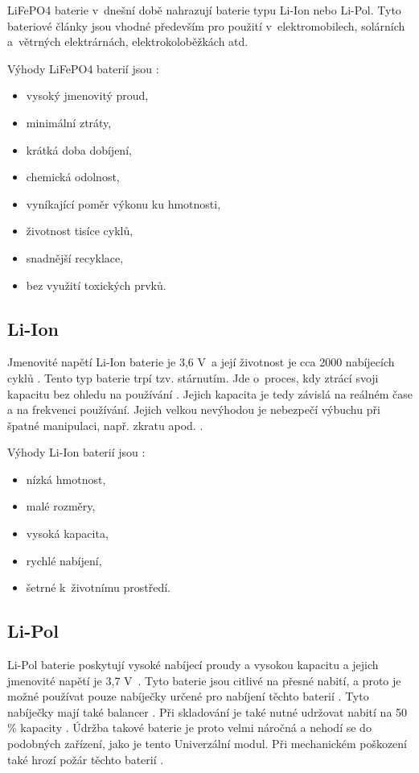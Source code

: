 LiFePO4 baterie v~dnešní době nahrazují baterie typu Li-Ion nebo Li-Pol.
Tyto bateriové články jsou vhodné především pro použití v~elektromobilech, solárních a~větrných elektrárnách, elektrokoloběžkách atd. 

Výhody LiFePO4 baterií jsou \cite{LiFePO4_smart}:
\begin{itemize}
  \item vysoký jmenovitý proud,
  \item minimální ztráty,
  \item krátká doba dobíjení,
  \item chemická odolnost,
  \item vyníkající poměr výkonu ku hmotnosti,
  \item životnost tisíce cyklů,
  \item snadnější recyklace,
  \item bez využití toxických prvků.
\end{itemize}

\subsection{Li-Ion}
Jmenovité napětí Li-Ion baterie je 3,6 V~a její životnost je cca 2000 nabíjecích cyklů \cite{Li-Ion}. Tento typ baterie trpí tzv. stárnutím. Jde o~proces, kdy ztrácí 
svoji kapacitu bez ohledu na používání \cite{Li-Ion}. Jejich kapacita je tedy závislá na reálném čase a na frekvenci používání. Jejich velkou nevýhodou je nebezpečí 
výbuchu při špatné manipulaci, např. zkratu apod. \cite{Li-Ion}. 

Výhody Li-Ion baterií jsou \cite{Li-Ion}:
\begin{itemize}
  \item nízká hmotnost,
  \item malé rozměry,
  \item vysoká kapacita,
  \item rychlé nabíjení,
  \item šetrné k~životnímu prostředí. 
\end{itemize}

\subsection{Li-Pol}
Li-Pol baterie poskytují vysoké nabíjecí proudy a vysokou kapacitu a jejich jmenovité napětí je 3,7 V~\cite{akumulatory}. Tyto baterie jsou citlivé na přesné nabití, a proto 
je možné používat pouze nabíječky určené pro nabíjení těchto baterií \cite{akumulatory}. Tyto nabíječky mají také balancer \cite{akumulatory}. Při skladování je také nutné 
udržovat nabití na 50 \% kapacity \cite{akumulatory}. Údržba takové baterie je proto velmi náročná a nehodí se do podobných zařízení, jako je tento Univerzální modul. Při 
mechanickém poškození také hrozí požár těchto baterií \cite{akumulatory}.

